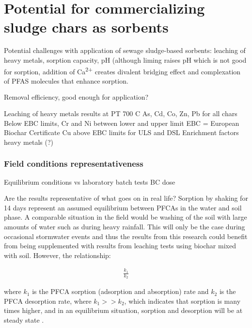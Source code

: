
\section{Potential for commercializing sludge chars as sorbents}
Potential challenges with application of sewage sludge-based sorbents: leaching of heavy metals, sorption capacity, pH (although liming raises pH which is not good for sorption, addition of Ca\textsuperscript{2+} creates divalent bridging effect and complexation of PFAS molecules that enhance sorption. 

Removal efficiency, good enough for application?

Leaching of heavy metals results at PT 700 C
    As, Cd, Co, Zn, Pb for all chars Below EBC limits, Cr and Ni between lower and upper limit
    EBC = European Biochar Certificate
    Cu above EBC limits for ULS and DSL
    Enrichment factors heavy metals (?)

\subsubsection{Field conditions representativeness}

Equilibrium conditions vs laboratory batch tests
BC dose

Are the results representative of what goes on in real life? Sorption by shaking for 14 days represent an assumed equilibrium between PFCAs in the water and soil phase. A comparable situation in the field would be washing of the soil with large amounts of water such as during heavy rainfall. This will only be the case during occasional stormwater events and thus the results from this research could benefit from being supplemented with results from leaching tests using biochar mixed with soil. However, the relationship:

\begin{align}
    \frac{k_1}{k_2}
\end{align}

where \(k_1\) is the PFCA sorption (adsorption and absorption) rate and \(k_2\) is the PFCA desorption rate, where \(k_1>>k_2\), which indicates that sorption is many times higher, and in an equilibrium situation, sorption and desorption will be at steady state \citep{Cornelissen2005}. 

